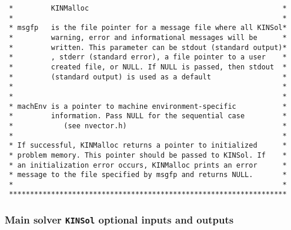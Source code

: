 \documentclass[11pt]{article}
\begin{document}
\begin{verbatim}
 *         KINMalloc                                              *
 *                                                                *
 * msgfp   is the file pointer for a message file where all KINSol*
 *         warning, error and informational messages will be      *
 *         written. This parameter can be stdout (standard output)*
 *         , stderr (standard error), a file pointer to a user    *
 *         created file, or NULL. If NULL is passed, then stdout  *
 *         (standard output) is used as a default                 *
 *                                                                *
 *                                                                *
 * machEnv is a pointer to machine environment-specific           *
 *         information. Pass NULL for the sequential case         *
 *            (see nvector.h)                                     *
 *                                                                *
 * If successful, KINMalloc returns a pointer to initialized      *
 * problem memory. This pointer should be passed to KINSol. If    *
 * an initialization error occurs, KINMalloc prints an error      *
 * message to the file specified by msgfp and returns NULL.       *
 *                                                                *
 ******************************************************************

\end{verbatim}
\normalsize

\subsubsection{Main solver {\tt KINSol} optional inputs and outputs}
\end{document}
